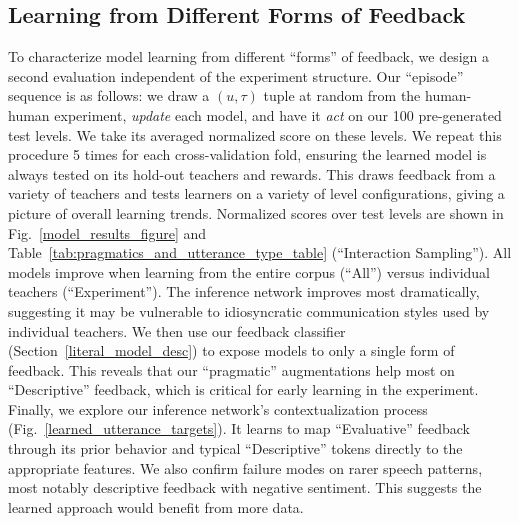 \documentclass[letterpaper]{article} %
\begin{document}
\subsection{Learning from Different Forms of Feedback}
\label{random_sample_interactions}
\label{feedback_types}
To characterize model learning from different ``forms'' of feedback, we design a second evaluation independent of the experiment structure. Our ``episode'' sequence is as follows: we draw a $(u, \tau)$ tuple at random from the human-human experiment, \emph{update} each model, and have it \emph{act} on our 100 pre-generated test levels. We take its averaged normalized score on these levels. We repeat this procedure 5 times for each cross-validation fold, ensuring the learned model is always tested on its hold-out teachers and rewards. This draws feedback from a variety of teachers and tests learners on a variety of level configurations, giving a picture of overall learning trends. Normalized scores over test levels are shown in Fig.~\ref{model_results_figure} and Table~\ref{tab:pragmatics_and_utterance_type_table} (``Interaction Sampling''). All models improve when learning from the entire corpus (``All'') versus individual teachers (``Experiment''). The inference network improves most dramatically, suggesting it may be vulnerable to idiosyncratic communication styles used by individual teachers. We then use our feedback classifier (Section~\ref{literal_model_desc}) to expose models to only a single form of feedback. This reveals that our ``pragmatic'' augmentations help most on ``Descriptive'' feedback, which is critical for early learning in the experiment. Finally, we explore our inference network's contextualization process (Fig.~\ref{learned_utterance_targets}). It learns to map ``Evaluative'' feedback through its prior behavior and typical ``Descriptive'' tokens directly to the appropriate features. We also confirm failure modes on rarer speech patterns, most notably descriptive feedback with negative sentiment. This suggests the learned approach would benefit from more data.

\vspace{-1.54mm}
\end{document}
